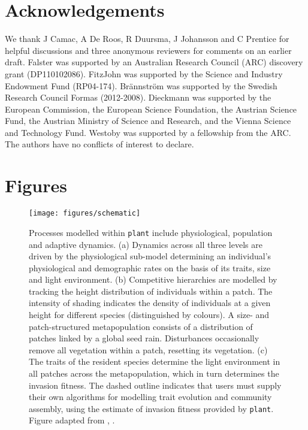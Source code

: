 \documentclass[a4paper,11pt]{article}
\newcommand{\plant}{\texttt{plant}}
\begin{document}
\section{Acknowledgements}

We thank J Camac, A De Roos, R Duursma, J Johansson and C Prentice for helpful
discussions and three anonymous reviewers for comments on an earlier draft. Falster
was supported by an Australian Research Council (ARC) discovery grant (DP110102086).
FitzJohn was supported by the Science and Industry Endowment Fund (RP04-174).
Br{\"a}nnstr{\"o}m was supported by the Swedish Research Council Formas (2012-2008).
Dieckmann was supported by the European Commission, the European Science Foundation,
the Austrian Science Fund, the Austrian Ministry of Science and Research, and the
Vienna Science and Technology Fund. Westoby was supported by a fellowship from the ARC.
The authors have no conflicts of interest to declare.

\clearpage


\clearpage

\section{Figures}\label{figures}

\begin{figure}[h!]
\centering
\texttt{[image: figures/schematic]}

\caption{Processes modelled within {\plant} include physiological, population and
adaptive dynamics.
(a) Dynamics across all three levels are driven by the
physiological sub-model determining an individual's physiological and
demographic rates on the basis of its traits, size and light environment.
(b) Competitive hierarchies are modelled by tracking the height distribution of
individuals within a patch. The intensity
of shading indicates the density of individuals at a given height for
different species (distinguished by colours). A size- and patch-structured
metapopulation consists of a distribution of patches linked by a global seed rain.
Disturbances occasionally remove all vegetation within a patch, resetting its vegetation. (c) The traits of the resident species determine the light environment
in all patches across the metapopulation, which in turn determines the invasion fitness.
The dashed outline indicates that users must supply their own algorithms for
modelling trait evolution and community assembly, using the estimate of
invasion fitness provided by {\plant}. Figure adapted from
\citet{Falster-2011}, \citet{Falster-2015}.
}

\label{fig:schematic}
\end{figure}
\end{document}
